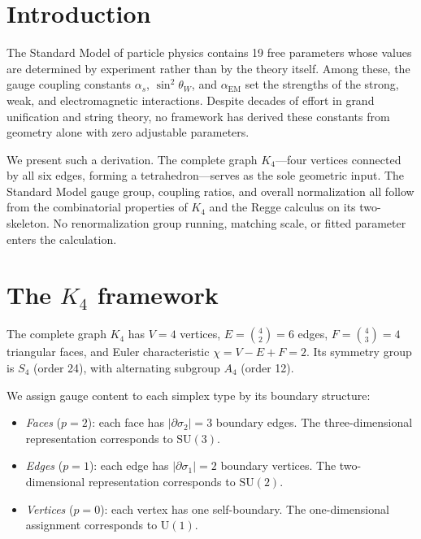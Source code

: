 \documentclass[aip,graphicx]{revtex4-1}
\begin{document}
\maketitle


\section{Introduction}
\label{sec:intro}

The Standard Model of particle physics contains 19 free parameters
whose values are determined by experiment rather than by the theory
itself.\cite{pdg2024} Among these, the gauge coupling constants
$\alpha_s$, $\sin^2\theta_W$, and $\alpha_{\mathrm{EM}}$ set the
strengths of the strong, weak, and electromagnetic interactions.
Despite decades of effort in grand unification
\cite{georgi1974,pati1974} and string theory,\cite{polchinski1998}
no framework has derived these constants from geometry alone with
zero adjustable parameters.

We present such a derivation. The complete graph $K_4$---four
vertices connected by all six edges, forming a tetrahedron---serves
as the sole geometric input. The Standard Model gauge group, coupling
ratios, and overall normalization all follow from the combinatorial
properties of $K_4$ and the Regge calculus on its two-skeleton. No
renormalization group running, matching scale, or fitted parameter
enters the calculation.


\section{The $K_4$ framework}
\label{sec:framework}

The complete graph $K_4$ has $V = 4$ vertices, $E = \binom{4}{2}= 6$
edges, $F = \binom{4}{3} = 4$ triangular faces, and Euler
characteristic $\chi = V - E + F = 2$. Its symmetry group is $S_4$
(order 24), with alternating subgroup $A_4$ (order 12).

We assign gauge content to each simplex type by its boundary structure:

\begin{itemize}
\item \textit{Faces} ($p = 2$): each face has $|\partial\sigma_2|= 3$
boundary edges. The three-dimensional representation corresponds to
$\mathrm{SU}(3)$.
\item \textit{Edges} ($p = 1$): each edge has $|\partial\sigma_1|= 2$
boundary vertices. The two-dimensional representation corresponds to
$\mathrm{SU}(2)$.
\item \textit{Vertices} ($p = 0$): each vertex has one self-boundary.
The one-dimensional assignment corresponds to $\mathrm{U}(1)$.
\end{itemize}
\end{document}
